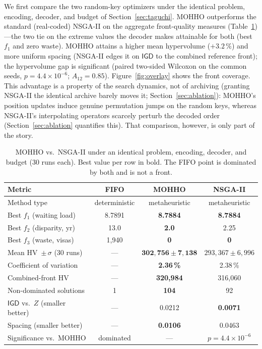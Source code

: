 \documentclass[runningheads]{llncs}
\newcommand{\HV}{\textsf{HV}}
\newcommand{\IGD}{\textsf{IGD}}
\begin{document}
We first compare the two random-key optimizers under the identical problem, encoding, decoder, and budget of Section~\ref{sec:taguchi}. MOHHO outperforms the standard (real-coded) NSGA-II on the aggregate front-quality measures (Table~\ref{tab:nsga})---the two tie on the extreme values the decoder makes attainable for both (best $f_1$ and zero waste). MOHHO attains a higher mean hypervolume ($+3.2\,\%$) and more uniform spacing (NSGA-II edges it on $\IGD$ to the combined reference front); the hypervolume gap is significant (paired two-sided Wilcoxon on the common seeds, $p=4.4\times10^{-6}$; $A_{12}=0.85$). Figure~\ref{fig:overlay} shows the front coverage. This advantage is a property of the search dynamics, not of archiving (granting NSGA-II the identical archive barely moves it; Section~\ref{sec:ablation}): MOHHO's position updates induce genuine permutation jumps on the random keys, whereas NSGA-II's interpolating operators scarcely perturb the decoded order (Section~\ref{sec:ablation} quantifies this). That comparison, however, is only part of the story.

\begin{table}[t]
\centering
\caption{MOHHO vs.\ NSGA-II under an identical problem, encoding, decoder, and budget (30 runs each). Best value per row in bold. The FIFO point is dominated by both and is not a front.}
\label{tab:nsga}
\small
\begin{tabular}{lccc}
\toprule
\textbf{Metric} & \textbf{FIFO} & \textbf{MOHHO} & \textbf{NSGA-II}\\
\midrule
Method type & deterministic & metaheuristic & metaheuristic\\
Best $f_1$ (waiting load) & 8.7891 & \textbf{8.7884} & \textbf{8.7884}\\
Best $f_2$ (disparity, yr) & 13.0 & \textbf{2.0} & 2.25\\
Best $f_3$ (waste, visas) & 1{,}940 & \textbf{0} & \textbf{0}\\
Mean \HV\ $\pm\,\sigma$ (30 runs) & --- & $\mathbf{302{,}756 \pm 7{,}138}$ & $293{,}367 \pm 6{,}996$\\
Coefficient of variation & --- & \textbf{2.36\,\%} & 2.38\,\%\\
Combined-front \HV & --- & \textbf{320{,}984} & 316{,}060\\
Non-dominated solutions & 1 & \textbf{104} & 92\\
$\IGD$ vs.\ $Z$ (smaller better) & --- & 0.0212 & \textbf{0.0071}\\
Spacing (smaller better) & --- & \textbf{0.0106} & 0.0463\\
Significance vs.\ MOHHO & dominated & --- & $p=4.4\times10^{-6}$\\
\bottomrule
\end{tabular}
\end{table}
\end{document}
